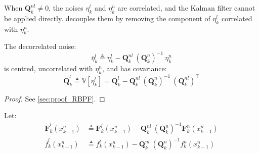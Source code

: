 When $\mathbf{Q}_k^{nl}\neq 0$, the noises $\eta_k^l$ and $\eta_k^n$ are correlated, and the Kalman filter cannot be applied directly.  decouples them by removing the component of $\eta_k^l$ correlated with $\eta_k^n$.

\begin{proposition}\label{th:RBPF_decorrelation}
	The decorrelated noise:
	\begin{equation}
		\overline{\eta}_k^l\triangleq \eta_k^l-\mathbf{Q}_k^{nl}\:(\mathbf{Q}_k^n)^{-1}\:\eta_k^n
	\end{equation}
	is centred, uncorrelated with $\eta_k^n$, and has covariance:
	\begin{equation}
		\overline{\mathbf{Q}}_k^l\triangleq\mathbb{V}\left[\overline{\eta}_k^l\right]=\mathbf{Q}_k^l-\mathbf{Q}_k^{nl}\:(\mathbf{Q}_k^n)^{-1}\:(\mathbf{Q}_k^{nl})^\top
	\end{equation}
\end{proposition}

\begin{proof}
	See \cref{sec:proof_RBPF}.
\end{proof}

Let:\begin{align}
	\overline{\mathbf{F}}_k^l(x_{k-1}^n)&\triangleq \mathbf{F}_k^l(x_{k-1}^n)-\mathbf{Q}_k^{nl}\:(\mathbf{Q}_k^n)^{-1}\mathbf{F}_k^n(x_{k-1}^n)\\
	\overline{f}_k^l(x_{k-1}^n)&\triangleq f_k^l(x_{k-1}^n)-\mathbf{Q}_k^{nl}\:(\mathbf{Q}_k^n)^{-1}f_k^n(x_{k-1}^n)
\end{align}

